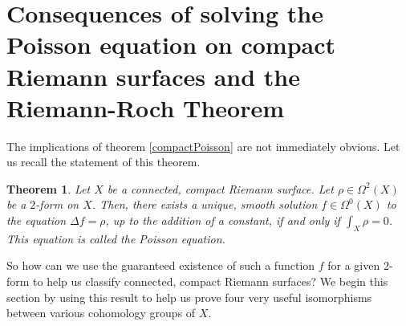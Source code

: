 \documentclass[11pt]{report}
\newtheorem*{thm*}{Theorem}
\theoremstyle{definition}
\begin{document}
\section{Consequences of solving the Poisson equation on compact Riemann surfaces and the Riemann-Roch Theorem}
The implications of theorem \ref{compactPoisson} are not immediately obvious. Let us recall the statement of this theorem.
\begin{thm*}
  Let $X$ be a connected, compact Riemann surface. Let $\rho \in \Omega^2(X)$ be a $2$-form on $X$. Then, there exists a unique, smooth solution $f \in \Omega^0(X)$ to the equation $\Delta f = \rho$, up to the addition of a constant, if and only if $\int_X \rho = 0$. This equation is called the Poisson equation.
\end{thm*}
So how can we use the guaranteed existence of such a function $f$ for a given $2$-form to help us classify connected, compact Riemann surfaces? We begin this section by using this result to help us prove four very useful isomorphisms between various cohomology groups of $X$.
\end{document}
